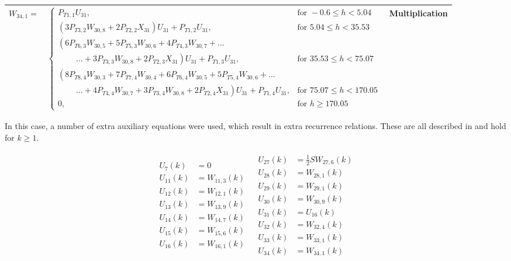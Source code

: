 \begin{longtable}{|p{1.5cm}|l|p{2cm}|}
$W_{34,1}=$ & $ 
\begin{cases}
P_{T 1,1}U_{31}, & \text{for } -0.6 \leq h < 5.04  \\
\left(3P_{T 3,2}W_{30,8}+2P_{T 2,2}X_{31}\right)U_{31}+P_{T 1,2}U_{31}, &  \text{for } 5.04\leq h < 35.53   \\
\left(6 P_{T 6,3}W_{30,5}+5P_{T 5,3}W_{30,6}+4P_{T 4,3}W_{30,7}+ \dots
\right. \\
\qquad\  \left. \dotsc +3P_{T 3,3}W_{30,8}+2P_{T 2,3}X_{31}\right)U_{31}+P_{T 1,3}U_{31}, &  \text{for } 35.53\leq h < 75.07   \\
\left(8 P_{T 8,4}W_{30,3}+7P_{T 7,4}W_{30,4}+6P_{T 6,4}W_{30,5}
+5P_{T 5,4}W_{30,6}+ \dots \right. \\
\qquad\  \left. \dotsc +4P_{T 4,4}W_{30,7}+3P_{T 3,4}W_{30,8}+2P_{T 2,4}X_{31}\right)U_{31}+P_{T 1,4}U_{31}, &  \text{for } 75.07\leq h < 170.05   \\
0, &  \text{for }  h \geq 170.05   
\end{cases}
 $ & Multiplication \\ \hline


\end{longtable}




In this case, a number of extra auxiliary equations were used, which result in extra recurrence relations. These are all described in  and hold for $k\geq 1$.

\begin{align} \label{eq:allRecRel3}
\begin{split}
U_{7} \left(k\right)&=0 \\
U_{11}\left(k\right)&=W_{11,3}\left(k\right)\\
U_{12}\left(k\right)&=W_{12,1}\left(k\right)\\
U_{13}\left(k\right)&=W_{13,9}\left(k\right)\\
U_{14}\left(k\right)&=W_{14,7}\left(k\right)\\
U_{15}\left(k\right)&=W_{15,6}\left(k\right)\\
U_{16}\left(k\right)&=W_{16,1}\left(k\right)\\
\end{split}
&
\begin{split}
U_{27}\left(k\right)&=\frac{1}{2}SW_{27,6}\left(k\right)\\
U_{28}\left(k\right)&=W_{28,1}\left(k\right)\\
U_{29}\left(k\right)&=W_{29,1}\left(k\right)\\
U_{30}\left(k\right)&=W_{30,9}\left(k\right)\\
U_{31}\left(k\right)&=U_{16}\left(k\right)\\
U_{32}\left(k\right)&=W_{32,4}\left(k\right)\\
U_{33}\left(k\right)&=W_{33,1}\left(k\right)\\
U_{34}\left(k\right)&=W_{34,1}\left(k\right)\\
\end{split}
\end{align}




